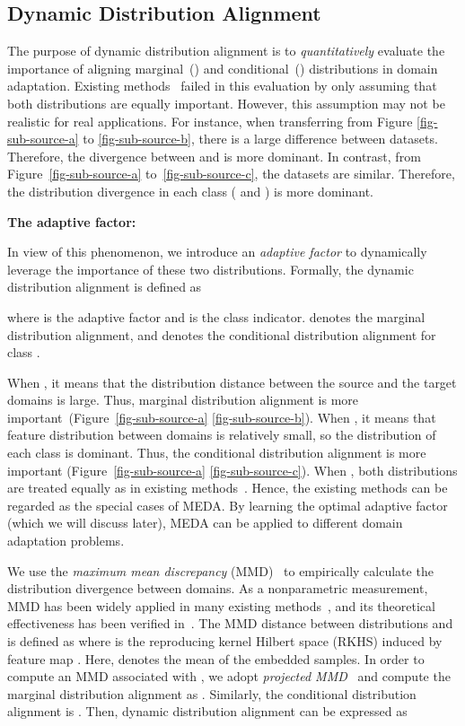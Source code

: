 \documentclass[sigconf]{acmart}
\begin{document}
\subsection{Dynamic Distribution Alignment}

The purpose of dynamic distribution alignment is to \textit{quantitatively} evaluate the importance of aligning marginal~() and conditional~() distributions in domain adaptation.
Existing methods~\cite{long2013transfer,zhang2017joint} failed in this evaluation by only assuming that both distributions are equally important. However, this assumption may not be realistic for real applications. For instance, when transferring from Figure \ref{fig-sub-source-a} to \ref{fig-sub-source-b}, there is a large difference between datasets. Therefore, the divergence between  and  is more dominant. In contrast, from Figure~\ref{fig-sub-source-a} to~\ref{fig-sub-source-c}, the datasets are similar. Therefore, the distribution divergence in each class ( and ) is more dominant. 

\textbf{The adaptive factor:}

In view of this phenomenon, we introduce an \textit{adaptive factor} to dynamically leverage the importance of these two distributions. Formally, the dynamic distribution alignment  is defined as

where  is the adaptive factor and  is the class indicator.  denotes the marginal distribution alignment, and  denotes the conditional distribution alignment for class .

When , it means that the distribution distance between the source and the target domains is large. Thus, marginal distribution alignment is more important~(Figure~\ref{fig-sub-source-a}  \ref{fig-sub-source-b}). When , it means that feature distribution between domains is relatively small, so the distribution of each class is dominant. Thus, the conditional distribution alignment is more important (Figure~\ref{fig-sub-source-a}  \ref{fig-sub-source-c}). When , both distributions are treated equally as in existing methods~\cite{long2013transfer,zhang2017joint}. Hence, the existing methods can be regarded as the special cases of MEDA. By learning the optimal adaptive factor  (which we will discuss later), MEDA can be applied to different domain adaptation problems.

We use the \textit{maximum mean discrepancy} (MMD)~\cite{ben2007analysis} to empirically calculate the distribution divergence between domains. As a nonparametric measurement, MMD has been widely applied in many existing methods~\cite{zhang2017joint,ghifary2017scatter,pan2011domain}, and its theoretical effectiveness has been verified in~\cite{gretton2012kernel}. The MMD distance between distributions  and  is defined as  where  is the reproducing kernel Hilbert space (RKHS) induced by feature map . Here,  denotes the mean of the embedded samples. In order to compute an MMD associated with , we adopt \textit{projected MMD}~\cite{quanz2009large} and compute the marginal distribution alignment as . Similarly, the conditional distribution alignment is . Then, dynamic distribution alignment can be expressed as
\end{document}
